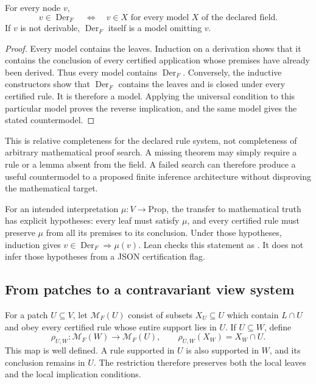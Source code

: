 \begin{PPTtheorem}
\label{PPT:res:24:1}
\label{PPT:thm:relative-completeness}
For every node $v$,
\[
v\in\operatorname{Der}_F
\quad\Longleftrightarrow\quad
\text{$v\in X$ for every model $X$ of the declared field}.
\]
If $v$ is not derivable, $\operatorname{Der}_F$ itself is a model omitting $v$.
\end{PPTtheorem}
\begin{proof}
Every model contains the leaves. Induction on a derivation shows that it contains the conclusion of every certified application whose premises have already been derived. Thus every model contains $\operatorname{Der}_F$. Conversely, the inductive constructors show that $\operatorname{Der}_F$ contains the leaves and is closed under every certified rule. It is therefore a model. Applying the universal condition to this particular model proves the reverse implication, and the same model gives the stated countermodel.
\end{proof}

This is relative completeness for the declared rule system, not completeness of arbitrary mathematical proof search. A missing theorem may simply require a rule or a lemma absent from the field. A failed search can therefore produce a useful countermodel to a proposed finite inference architecture without disproving the mathematical target.

For an intended interpretation $\mu:V\to\mathrm{Prop}$, the transfer to mathematical truth has explicit hypotheses: every leaf must satisfy $\mu$, and every certified rule must preserve $\mu$ from all its premises to its conclusion. Under those hypotheses, induction gives $v\in\operatorname{Der}_F\Rightarrow\mu(v)$. Lean checks this statement as . It does not infer those hypotheses from a JSON certification flag.

\subsection{From patches to a contravariant view system}

For a patch $U\subseteq V$, let $\mathcal M_F(U)$ consist of subsets $X_U\subseteq U$ which contain $L\cap U$ and obey every certified rule whose entire support lies in $U$. If $U\subseteq W$, define
\[
\rho_{U,W}:\mathcal M_F(W)\longrightarrow\mathcal M_F(U),
\qquad \rho_{U,W}(X_W)=X_W\cap U.
\]
This map is well defined. A rule supported in $U$ is also supported in $W$, and its conclusion remains in $U$. The restriction therefore preserves both the local leaves and the local implication conditions.

